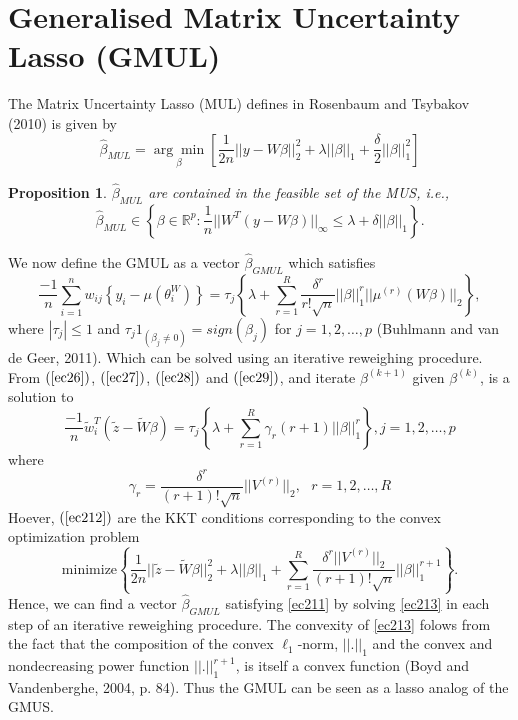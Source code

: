 \documentclass[a4paper,12pt,openany]{report}
\theoremstyle{plain}
\theoremstyle{plain}
\newtheorem{proposition}{\textbf{Proposition}}[section]
\theoremstyle{plain}
\theoremstyle{plain}
\theoremstyle{plain}
\theoremstyle{plain}
\theoremstyle{plain}
\theoremstyle{plain}
\theoremstyle{plain}
\theoremstyle{plain}
\theoremstyle{plain}
\theoremstyle{plain}
\begin{document}
\section{Generalised Matrix Uncertainty Lasso (GMUL)}
The Matrix Uncertainty Lasso (MUL) defines in Rosenbaum and Tsybakov (2010) is given by
\begin{equation}\label{ec210}
\hat{\beta}_{MUL} = \underset{\beta}{\arg\min}\left[\frac{1}{2n}||y-W\beta||_2^2 + \lambda||\beta||_1+\frac{\delta}{2}||\beta||_1^2\right]
\end{equation}
\begin{proposition}
	$\hat{\beta}_{MUL}$ are contained in the feasible set of the MUS, i.e.,
	\begin{equation}
	\hat{\beta}_{MUL}\in\left\lbrace\beta\in\mathbb{R}^p : \frac{1}{n}||W^T(y-W\beta)||_{\infty}\leq\lambda+\delta||\beta||_1\right\rbrace.
	\end{equation}
\end{proposition}
We now define the GMUL as a vector $\hat{\beta}_{GMUL}$ which satisfies
\begin{equation}
\frac{-1}{n}\sum_{i=1}^{n}w_{ij}\left\lbrace y_i-\mu(\theta_i^{W})\right\rbrace = \tau_j\left\lbrace\lambda+\sum_{r=1}^{R}\frac{\delta^r}{r!\sqrt{n}}||\beta||_1^r||\mu^{(r)}(W\beta)||_2\right\rbrace,
\end{equation}\label{ec211}
where $|\tau
_j|\leq 1$ and $\tau_j1_{(\beta_j\neq 0)}=sign(\beta_j)$ for $j=1,2,\ldots,p$ (Buhlmann and van de Geer, 2011). Which can be solved using an iterative reweighing procedure. From $(\ref{ec26})$, $(\ref{ec27})$, $(\ref{ec28})$ and $(\ref{ec29})$, and iterate $\beta^{(k+1)}$ given $\beta^{(k)}$, is a solution to
\begin{equation}\label{ec212}
\frac{-1}{n}\tilde{w}_i^T\left(\tilde{z}-\tilde{W}\beta\right) = \tau_j\left\lbrace\lambda+\sum_{r=1}^{R}\gamma_r(r+1)||\beta||_1^r\right\rbrace, j=1,2,\ldots,p
\end{equation}
where 
\begin{equation}\label{eq:gamma}
\gamma_r= \frac{\delta^r}{(r+1)!\sqrt{n}}||V^{(r)}||_2, \ \ \ r=1,2,\ldots,R
\end{equation}
Hoever, $(\ref{ec212})$ are the KKT conditions corresponding to the convex optimization problem
\begin{equation}\label{ec213}
\text{minimize}\left\lbrace\frac{1}{2n}||\tilde{z}-\tilde{W}\beta||_2^2 + \lambda||\beta||_1 + \sum_{r=1}^{R}\frac{\delta^r||V^{(r)}||_2}{(r+1)!\sqrt{n}}||\beta||_1^{r+1}\right\rbrace.
\end{equation}
Hence, we can find a vector $\hat{\beta}_{GMUL}$ satisfying \eqref{ec211} by solving \eqref{ec213} in each step of an iterative reweighing procedure. The convexity of \eqref{ec213} folows from the fact that the composition of the convex $\ell_1$-norm, $||.||_1$ and the convex and nondecreasing power function $||.||_1^{r+1}$, is itself a convex function (Boyd and Vandenberghe, 2004, p. 84). Thus the GMUL can be seen as a lasso analog of the GMUS.\\
\end{document}
